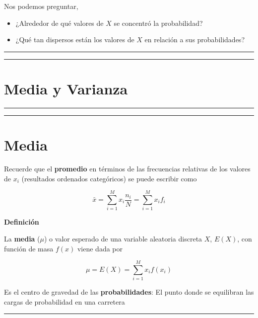 \documentclass[
]{book}
\begin{document}
Nos podemos preguntar,

\begin{itemize}
\item
  ¿Alrededor de qué valores de \(X\) se concentró la probabilidad?
\item
  ¿Qué tan dispersos están los valores de \(X\) en relación a sus probabilidades?
\end{itemize}

\begin{center}\rule{0.5\linewidth}{0.5pt}\end{center}

\begin{center}\rule{0.5\linewidth}{0.5pt}\end{center}

\hypertarget{media-y-varianza-1}{%
\section{Media y Varianza}\label{media-y-varianza-1}}

\begin{center}\rule{0.5\linewidth}{0.5pt}\end{center}

\begin{center}\rule{0.5\linewidth}{0.5pt}\end{center}

\hypertarget{media}{%
\section{Media}\label{media}}

Recuerde que el \textbf{promedio} en términos de las frecuencias relativas de los valores de \(x_i\) (resultados ordenados categóricos) se puede escribir como

\[\bar{x}= \sum_{i=1}^M x_i \frac{n_i}{N}=\sum_{i=1}^M x_i f_i\]

\textbf{Definición}

La \textbf{media} (\(\mu\)) o valor esperado de una variable aleatoria discreta \(X\), \(E(X)\), con función de masa \(f(x)\) viene dada por

\[ \mu = E(X)= \sum_{i=1}^M x_i f(x_i) \]

Es el centro de gravedad de las \textbf{probabilidades}: El punto donde se equilibran las cargas de probabilidad en una carretera

\begin{center}\rule{0.5\linewidth}{0.5pt}\end{center}
\end{document}
